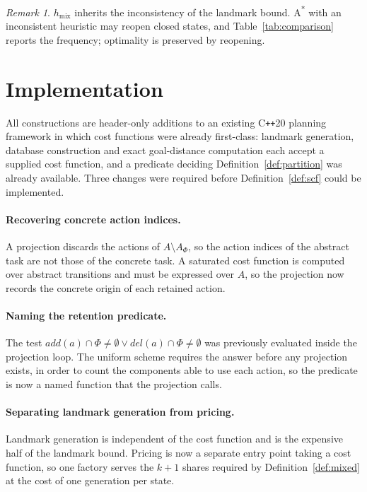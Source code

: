\documentclass[10pt,twocolumn,a4paper]{article}
\theoremstyle{plain}
\theoremstyle{definition}
\theoremstyle{remark}
\newtheorem{remark}[theorem]{Remark}
\newcommand{\add}{\mathit{add}}
\newcommand{\del}{\mathit{del}}
\begin{document}
\begin{remark}
$h_{\mathrm{mix}}$ inherits the inconsistency of the landmark bound.
A\textsuperscript{*} with an inconsistent heuristic may reopen closed states,
and Table~\ref{tab:comparison} reports the frequency; optimality is preserved
by reopening.
\end{remark}

\section{Implementation}
\label{sec:implementation}

All constructions are header-only additions to an existing C\texttt{++}20
planning framework in which cost functions were already first-class: landmark
generation, database construction and exact goal-distance computation each
accept a supplied cost function, and a predicate deciding
Definition~\ref{def:partition} was already available. Three changes were
required before Definition~\ref{def:scf} could be implemented.

\paragraph{Recovering concrete action indices.}
A projection discards the actions of $A \setminus A_\Phi$, so the action
indices of the abstract task are not those of the concrete task. A saturated
cost function is computed over abstract transitions and must be expressed over
$A$, so the projection now records the concrete origin of each retained action.

\paragraph{Naming the retention predicate.}
The test $\add(a) \cap \Phi \neq \emptyset \lor \del(a) \cap \Phi \neq
\emptyset$ was previously evaluated inside the projection loop. The uniform
scheme requires the answer before any projection exists, in order to count the
components able to use each action, so the predicate is now a named function
that the projection calls.

\paragraph{Separating landmark generation from pricing.}
Landmark generation is independent of the cost function and is the expensive
half of the landmark bound. Pricing is now a separate entry point taking a cost
function, so one factory serves the $k+1$ shares required by
Definition~\ref{def:mixed} at the cost of one generation per state.
\end{document}
